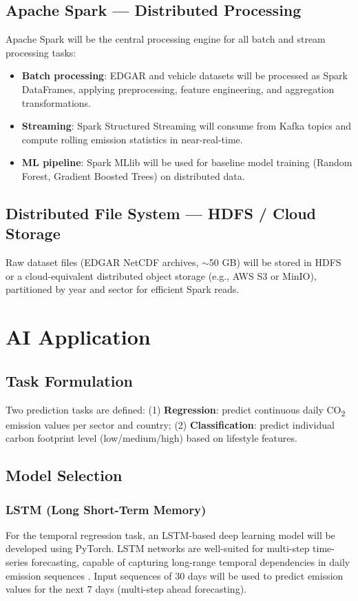 \documentclass[conference]{IEEEtran}
\begin{document}
\subsection{Apache Spark — Distributed Processing}
Apache Spark will be the central processing engine for all batch and stream processing tasks:
\begin{itemize}
    \item \textbf{Batch processing}: EDGAR and vehicle datasets will be processed as Spark DataFrames, applying preprocessing, feature engineering, and aggregation transformations.
    \item \textbf{Streaming}: Spark Structured Streaming will consume from Kafka topics and compute rolling emission statistics in near-real-time.
    \item \textbf{ML pipeline}: Spark MLlib will be used for baseline model training (Random Forest, Gradient Boosted Trees) on distributed data.
\end{itemize}

\subsection{Distributed File System — HDFS / Cloud Storage}
Raw dataset files (EDGAR NetCDF archives, $\sim$50 GB) will be stored in HDFS or a cloud-equivalent distributed object storage (e.g., AWS S3 or MinIO), partitioned by year and sector for efficient Spark reads.

\section{AI Application}

\subsection{Task Formulation}
Two prediction tasks are defined: (1) \textbf{Regression}: predict continuous daily CO\textsubscript{2} emission values per sector and country; (2) \textbf{Classification}: predict individual carbon footprint level (low/medium/high) based on lifestyle features.

\subsection{Model Selection}

\subsubsection{LSTM (Long Short-Term Memory)}
For the temporal regression task, an LSTM-based deep learning model will be developed using PyTorch. LSTM networks are well-suited for multi-step time-series forecasting, capable of capturing long-range temporal dependencies in daily emission sequences \cite{lstm_energy}. Input sequences of 30 days will be used to predict emission values for the next 7 days (multi-step ahead forecasting).
\end{document}
